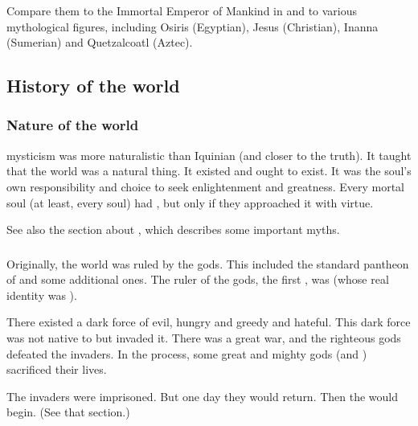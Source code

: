 Compare them to the Immortal Emperor of Mankind in \cite{RPG:Warhammer40000} and to various mythological figures, including Osiris (Egyptian), Jesus (Christian), Inanna (Sumerian) and Quetzalcoatl (Aztec). 









\subsection{History of the world}





\subsubsection{Nature of the world}
\Ortaican mysticism was more naturalistic than Iquinian (and closer to the truth). 
It taught that the world was a natural thing. 
It existed and ought to exist. 
It was the soul's own responsibility and choice to seek enlightenment and greatness. 
Every mortal soul (at least, every \scathaese soul) had , but only if they approached it with virtue.

See also the section about , which describes some important myths. 





\subsubsection{\Banes}
Originally, the world was ruled by the \Ortaican gods.
This included the standard pantheon of \Taorthae and some additional ones. 
The ruler of the gods, the first \Nechsain, was  (whose real identity was \Sethicus). 

There existed a dark force of evil, hungry and greedy and hateful. 
This dark force was not native to \Miith but invaded it. 
There was a great war, and the righteous gods defeated the invaders. 
In the process, some great and mighty gods (\Settras and \Tiamat) sacrificed their lives.

The invaders were imprisoned. 
But one day they would return. 
Then the  would begin. 
(See that section.) 


